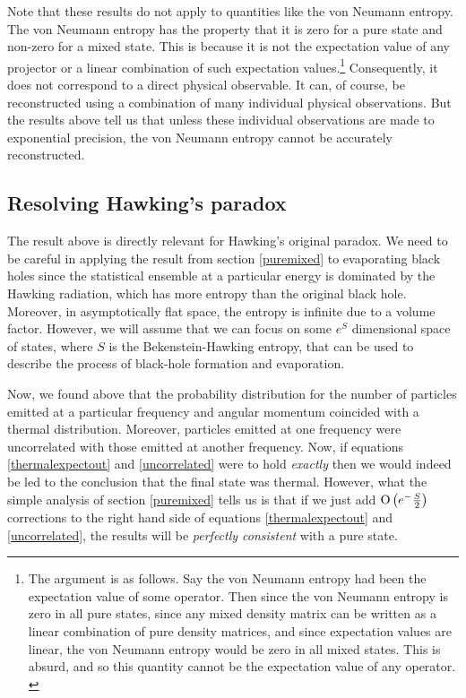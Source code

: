 \documentclass[12pt]{article}
\def\Or[#1]{{\text{O}}\left({#1}\right)}
\begin{document}
Note that these results do not apply to quantities like the von Neumann entropy. The von Neumann entropy has the property that it is zero for a pure state and non-zero for a mixed state. This is because it is not the expectation
value of any projector or a linear combination of such expectation values.\footnote{The argument is as follows. Say the von Neumann entropy had been the expectation value of some operator. Then since the von Neumann entropy is zero in all pure states, since any mixed density matrix can be written as a linear combination of pure density matrices,  and since expectation values are linear, the von Neumann entropy would be zero in all mixed states. This is absurd, and so this quantity cannot be the expectation value of any operator. \label{footvn}}  Consequently, it does not correspond to a direct physical observable. It can, of course, be reconstructed using a combination of many individual physical observations. But the results above tell us
that unless these individual observations are made to exponential precision,  the von Neumann entropy cannot be accurately reconstructed.

\subsection{Resolving Hawking's paradox \label{resolvehawking}}

The result above is directly relevant for Hawking's original paradox. We need to be careful in applying the result from section \ref{puremixed} to evaporating black holes since the statistical ensemble at a particular
energy is dominated by the Hawking radiation, which has more entropy than the original black hole. Moreover, in asymptotically flat space, the entropy is infinite due to a volume factor. However, we will assume that we can focus on some $e^{S}$ dimensional space of states, where $S$ is the Bekenstein-Hawking entropy, that can be used to describe the process of black-hole formation and evaporation.

Now,  we found above that the probability distribution for the number of particles emitted at a particular frequency and angular momentum coincided with a thermal distribution. Moreover, particles emitted at one frequency were uncorrelated with those emitted at another frequency. Now, if equations \eqref{thermalexpectout} and \eqref{uncorrelated} were to hold {\em exactly} then we would indeed be led to the conclusion that the final state was thermal. However, what the simple analysis of section \ref{puremixed} tells us is that if we just add $\Or[e^{-{S \over 2}}]$ corrections to the right hand side of equations \eqref{thermalexpectout} and \eqref{uncorrelated}, the results will be {\em perfectly consistent} with a pure state.
\end{document}
